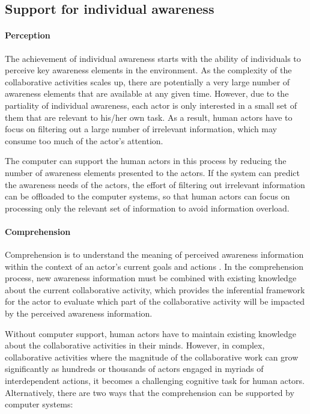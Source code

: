 \subsection{Support for individual awareness} %
\label{sub:support_for_individual_awareness}
\paragraph*{Perception} %
\label{par:perception}
The achievement of individual awareness starts with the ability of individuals to perceive key awareness elements in the environment. As the complexity of the collaborative activities scales up, there are potentially a very large number of awareness elements that are available at any given time. However, due to the partiality of individual awareness, each actor is only interested in a small set of them that are relevant to his/her own task. As a result, human actors have to focus on filtering out a large number of irrelevant information, which may consume too much of the actor's attention. 

The computer can support the human actors in this process by reducing the number of awareness elements presented to the actors. If the system can predict the awareness needs of the actors, the effort of filtering out irrelevant information can be offloaded to the computer systems, so that human actors can focus on processing only the relevant set of information to avoid information overload.

\paragraph*{Comprehension} %
\label{par:comprehension}
Comprehension is to understand the meaning of perceived awareness information within the context of an actor's current goals and actions \cite{oulasvirta2007a}. In the comprehension process, new awareness information must be combined with existing knowledge about the current collaborative activity, which provides the inferential framework \cite{carroll2003a} for the actor to evaluate which part of the collaborative activity will be impacted by the perceived awareness information. 

Without computer support, human actors have to maintain existing knowledge about the collaborative activities in their minds. However, in complex, collaborative activities where the magnitude of the collaborative work can grow significantly as hundreds or thousands of actors engaged in myriads of interdependent actions, it becomes a challenging cognitive task for human actors. Alternatively, there are two ways that the comprehension can be supported by computer systems: 

